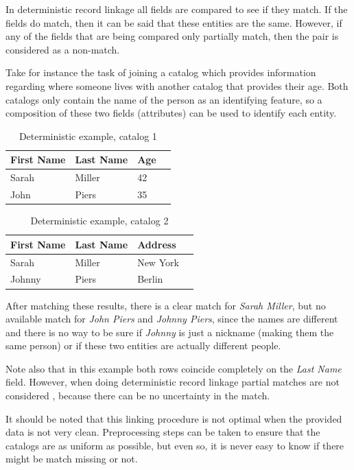\documentclass[epsfig,a4paper,11pt,titlepage,twoside,openany]{book}
\begin{document}
In deterministic record linkage all fields are compared to see if they match. If the fields do match, then it can be said that these entities are the same. However, if any of the fields that are being compared only partially match, then the pair is considered as a non-match. 

Take for instance the task of joining a catalog which provides information regarding where someone
lives with another catalog that provides their age. Both catalogs only contain the
name of the person as an identifying feature, so a composition of
these two fields (attributes) can be used to identify each entity.

\begin{table}[H]
  \centering{}
  \begin{tabular}{|l|l|l|l|}
    First Name & Last Name & Age \\ \hline
    Sarah & Miller & 42 \\
    John  & Piers  & 35  \\ 
  \end{tabular}
  \caption{Deterministic example, catalog 1}
  \label{tab:ex-deterministic-1}
\end{table}


\begin{table}[H]
  \centering{}
  \begin{tabular}{|l|l|l|l|}
    First Name & Last Name & Address \\ \hline
    Sarah  & Miller & New York \\
    Johnny & Piers  & Berlin  \\ 
  \end{tabular}
  \caption{Deterministic example, catalog 2}
  \label{tab:ex-deterministic-2}
\end{table}

After matching these results, there is a clear match for \textit{Sarah Miller}, but no available match for \textit{John Piers} and \textit{Johnny Piers}, since the
names are different and there is no way to be sure if \textit{Johnny} is just a nickname (making them the same person)
or if these two entities are actually different people.

Note also that in this example both rows coincide completely on the \textit{Last Name} field. However, when doing deterministic record linkage partial matches are not considered \cite{dusetzina_m_2014}, because there can be no uncertainty in the match.

It should be noted that this linking procedure is not optimal when the provided data is not very clean. Preprocessing steps can be taken to ensure that the catalogs are as
uniform as possible, but even so, it is never easy to know if there might be match missing or not.
\end{document}
